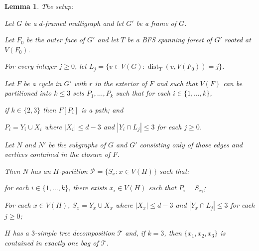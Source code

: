 \documentclass{patmorin}
\theoremstyle{plain}
\newtheorem{lem}[thm]{Lemma}
\theoremstyle{definition}
\DeclareMathOperator{\dist}{dist}
\newcommand{\PP}{\mathcal{P}}
\renewcommand{\ge}{\geqslant}
\renewcommand{\le}{\leqslant}
\begin{document}
\begin{lem}
	\label{induction} The setup:
	\begin{compactenum}
		\item Let $G$ be a $d$-framed multigraph and let $G'$ be a frame of $G$.
		\item Let $F_0$ be the outer face of $G'$ and let $T$ be a BFS spanning forest of $G'$ rooted at $V(F_0)$.
		\item For every integer $j\ge 0$, let $L_j=\{v\in V(G):\dist_T(v,V(F_0))=j\}$.
		\item Let $F$ be a cycle in $G'$ with $r$ in the exterior of $F$ and such that $V(F)$ can be partitioned into $k\le 3$ sets $P_1,\ldots,P_k$ such that for each $i\in\{1,\ldots,k\}$,
		\begin{compactenum}
			\item if $k\in\{2,3\}$ then $F[P_i]$ is a path; and
			\item $P_i=Y_i\cup X_i$ where $|X_i|\le d-3$ and $|Y_i\cap L_j| \le 3$ for each $j\ge 0$.
		\end{compactenum}
		\item Let $N$ and $N'$ be the subgraphs of $G$ and $G'$ consisting only of those edges and vertices contained in the closure of $F$.
	\end{compactenum}
	Then $N$ has an $H$-partition $\PP=\{S_x: x\in V(H)\}$ such that:
	\begin{compactenum}[(i)]
		\item for each $i\in\{1,\ldots,k\}$, there exists $x_i\in V(H)$ such that $P_i=S_{x_i}$;
		\item For each $x\in V(H)$, $S_x=Y_x\cup X_x$ where $|X_x|\le d-3$ and $|Y_x\cap L_j|\le 3$ for each $j\ge 0$;
		\item $H$ has a $3$-simple tree decomposition $\mathcal{T}$ and, if $k=3$, then $\{x_1,x_2,x_3\}$ is contained in exactly one bag of $\mathcal{T}$.
	\end{compactenum}
\end{lem}
\end{document}
